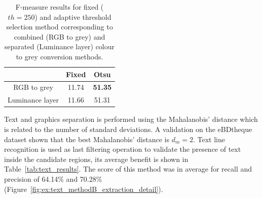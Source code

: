   \begin{table}[ht]
    \centering
    \caption[F-measure results for fixed and adaptive threshold selection method corresponding to combined and separated colour to grey conversion methods]{F-measure results for fixed ($th=250$) and adaptive threshold selection method corresponding to combined (RGB to grey) and separated (Luminance layer) colour to grey conversion methods.}
    \begin{tabular}{|c|c|c|}
      \hline
       & Fixed & Otsu \\ 
      \hline
      RGB to grey & 11.74 & \textbf{51.35}  \\ 
      \hline
      Luminance layer & 11.66 & 51.31 \\ 
      \hline
    \end{tabular}
    \label{fig:ex:text_extraction_methodB_segmentation}
  \end{table}%


Text and graphics separation is performed using the Mahalanobis' distance which is related to the number of standard deviations.
A validation on the eBDtheque dataset shown that the best Mahalanobis' distance is $d_m=2$.
Text line recognition is used as last filtering operation to validate the presence of text inside the candidate regions, its average benefit is shown in Table~\ref{tab:text_results}.
The score of this method was in average for recall and precision of 64.14\% and 70.28\% (Figure~\ref{fig:ex:text_methodB_extraction_detail}).

